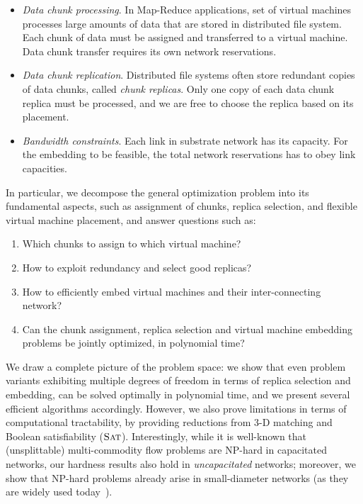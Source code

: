 \begin{itemize}
\item \emph{Data chunk processing}. In Map-Reduce applications, set of virtual machines processes large amounts of data that are stored in distributed file system. Each chunk of data must be assigned and transferred to a virtual machine. Data chunk transfer requires its own network reservations.

\item \emph{Data chunk replication}. Distributed file systems often store redundant copies of data chunks, called \emph{chunk replicas}. Only one copy of each data chunk replica must be processed, and we are free to choose the replica based on its placement.

\item \emph{Bandwidth constraints}. Each link in substrate network has its capacity. For the embedding to be feasible, the total network reservations has to obey link capacities.
\end{itemize}


In particular, we decompose the general optimization problem into its fundamental aspects, such as
assignment of chunks, replica selection, and flexible virtual machine
placement, and answer questions such as:
\begin{enumerate}
\item Which chunks to assign to which virtual machine?

\item How to exploit redundancy and select good replicas?

\item How to efficiently embed virtual machines and their inter-connecting network?

\item Can the chunk assignment, replica selection and virtual machine embedding problems be jointly optimized, in polynomial time?
\end{enumerate}

We draw a complete picture of the problem space: we show that
even problem variants exhibiting multiple degrees of freedom in terms of
replica selection and embedding,
can be solved optimally in polynomial time, and we present several efficient
algorithms accordingly. However, we also prove limitations in terms of
computational tractability, by providing reductions from 3-D matching
and Boolean satisfiability ($\textsc{Sat}$). Interestingly,
while it is well-known that (unsplittable) multi-commodity flow
problems are NP-hard in capacitated networks, our hardness results also hold in \emph{uncapacitated}
networks; moreover, we show that NP-hard problems already arise in small-diameter networks (as they are
widely used today~\cite{fattree}).

